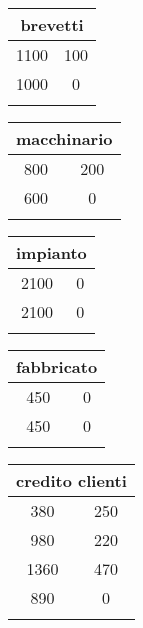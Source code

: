 \documentclass[twocolumn]{article}
\begin{document}
\begin{table}[ht]\centering 
\begin{tabular}{|c|c|}
\hline
\multicolumn{2}{|c|}{brevetti} \\ 
\hline  \hline 
1100 & 100 \\ 
\hline
1000 & 0 \\ 
 \\ 
\hline
\end{tabular} \end{table} 
\begin{table}[ht]\centering 
\begin{tabular}{|c|c|}
\hline
\multicolumn{2}{|c|}{macchinario} \\ 
\hline  \hline 
800 & 200 \\ 
\hline
600 & 0 \\ 
 \\ 
\hline
\end{tabular} \end{table} 
\begin{table}[ht]\centering 
\begin{tabular}{|c|c|}
\hline
\multicolumn{2}{|c|}{impianto} \\ 
\hline  \hline 
2100 & 0 \\ 
\hline
2100 & 0 \\ 
 \\ 
\hline
\end{tabular} \end{table} 
\begin{table}[ht]\centering 
\begin{tabular}{|c|c|}
\hline
\multicolumn{2}{|c|}{fabbricato} \\ 
\hline  \hline 
450 & 0 \\ 
\hline
450 & 0 \\ 
 \\ 
\hline
\end{tabular} \end{table} 
\begin{table}[ht]\centering 
\begin{tabular}{|c|c|}
\hline
\multicolumn{2}{|c|}{credito clienti} \\ 
\hline 380 & 250 \\ 
980 & 220 \\ 
 \hline 
1360 & 470 \\ 
\hline
890 & 0 \\ 
 \\ 
\hline
\end{tabular} \end{table} 
\end{document}
